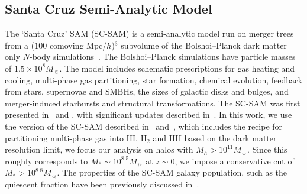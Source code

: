 \documentclass[tighten, preprint]{aastex62}
\begin{document}
\subsection{Santa Cruz Semi-Analytic Model} \label{sec:scsam}
The `Santa Cruz' SAM (SC-SAM) is a semi-analytic model run on 
merger trees from a ($100$ comoving Mpc/$h$)$^3$ subvolume of the 
Bolshoi--Planck dark matter only $N$-body simulations~\citep{rodriguez-puebla2016}. 
The Bolshoi--Planck simulations have particle masses of $1.5 \times 10^8 M_\sun$. 
The model includes schematic prescriptions for gas heating and 
cooling, multi-phase gas partitioning, star formation, chemical 
evolution, feedback from stars, supernovae and SMBHs, the sizes 
of galactic disks and 
bulges, and merger-induced starbursts and structural transformations. 
The SC-SAM was first presented in~\cite{somerville1999} and 
\cite{somerville2001}, with significant updates described 
in~\cite{somerville2008, somerville2008a, somerville2012, porter2014, 
popping2014, somerville2015a}. In this work, we use the version of 
the SC-SAM described in~\cite{popping2014} and~\cite{somerville2015a}, 
which includes the \cite{gnedin2011} recipe for partitioning multi-phase
gas into HI, H$_2$ and HII %
based on the dark matter resolution limit,
we focus our analysis on halos with $M_h{>}10^{11} M_\sun$.
Since this roughly corresponds to $M_*{\sim}10^{8.5} M_\sun$ at 
$z\sim 0$, we impose a conservative cut of $M_* > 10^{8.8}M_\sun$. 
The properties of the SC-SAM galaxy population, 
such as the quiescent fraction have been previously discussed 
in~\cite{brennan2015,somerville2015a,somerville2015,brennan2017,pandya2017}.

\end{document}
